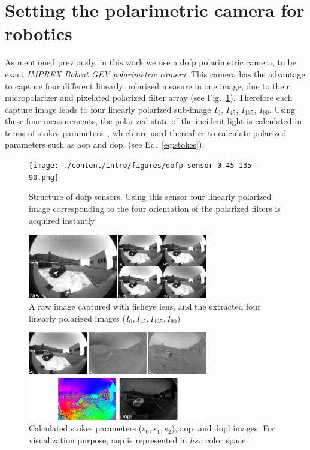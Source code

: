 \graphicspath{{./content/intro/figures/}}
\section{Setting the polarimetric camera for robotics}
\label{sec:rosify}

As mentioned previously, in this work we use a \gls{dofp} polarimetric camera,
to be exact \textit{IMPREX Bobcat GEV polarimetric camera}.
This camera has the advantage to capture four different linearly polarized
measure in one image, due to their micropolarizer and pixelated polarized
filter array (see Fig.~\ref{fig:dofp-sensor}).
Therefore each capture image leads to four linearly polarized sub-image $I_0$,
$I_{45}$, $I_{135}$, $I_{90}$.
Using these four measurements, the polarized state of the incident light is
calculated in terms of stokes parameters~\cite{goldstein2017polarized}, which
are used thereafter to calculate polarized parameters such as \gls{aop} and
\gls{dopl} (see Eq.~\ref{eq:stokes}).

\begin{figure}
  \centering
  \texttt{[image: ./content/intro/figures/dofp-sensor-0-45-135-90.png]}
  \caption{Structure of \gls{dofp} sensors. Using this sensor four linearly
    polarized image corresponding to the four orientation of the polarized
    filters is acquired instantly}
    \label{fig:dofp-sensor}
\end{figure}

\begin{figure}
  \centering
  \includegraphics[width=0.7\textwidth]{./content/intro/figures/raw-sp.png}
  \caption{A raw image captured with fisheye lens, and the extracted four
    linearly polarized images ($I_0, I_{45}, I_{135}, I_{90}$)}
  \label{fig:raw-sp}
\end{figure}

\begin{figure}
  \centering
  \includegraphics[width=0.7\textwidth]{./content/intro/figures/stokes_aop_dop.png}
  \caption{Calculated stokes parameters ($s_0, s_1, s_2$), \gls{aop}, and
    \gls{dopl} images. For visualization purpose, \gls{aop} is represented in
    $hsv$ color space.}
  \label{fig:stokes-aop-dop}
\end{figure}





